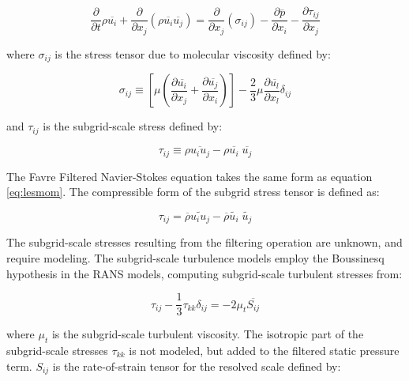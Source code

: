 \begin{equation} \label{eq:lesmom}
\frac{\partial}{\partial t} \rho \overline{u_i}
+ \frac{\partial}{\partial x_j} \left( \rho \overline{u_i} \overline{u_j} \right)
= \frac{\partial}{\partial x_j} \left( \sigma_{ij} \right)
- \frac{\partial \overline{p}}{\partial x_i}
- \frac{\partial \tau_{ij}}{\partial x_j}
\end{equation}

\noindent where $\sigma_{ij}$ is the stress tensor due to molecular viscosity defined by:

\begin{equation} \label{eq:lesstress}
\sigma_{ij}
\equiv
\left[ \mu \left( \frac{\partial \overline{u_i}}{\partial x_{j}} + \frac{\partial \overline{u_j}}{\partial x_{i}} \right) \right]
- \frac{2}{3} \mu \frac{\partial \overline{u_l}}{\partial x_l} \delta_{ij}
\end{equation}

\noindent and $\tau_{ij}$ is the subgrid-scale stress defined by:

\begin{equation} \label{eq:lessubstress}
\tau_{ij} \equiv \rho \overline{u_i u_j} - \rho \overline{u_i} \; \overline{u_j}
\end{equation}

The Favre Filtered Navier-Stokes equation takes the same form as equation \ref{eq:lesmom}. The compressible form of the subgrid stress tensor is defined as:

\begin{equation} \label{eq:lescompsub}
\tau_{ij} = \overline{\rho} \tilde{u_i u_j} - \overline{\rho} \tilde{u_i} \; \tilde{u_j}
\end{equation}

The subgrid-scale stresses resulting from the filtering operation are unknown, and require modeling. The subgrid-scale turbulence models employ the Boussinesq hypothesis \citep{bousinesque} in the RANS models, computing subgrid-scale turbulent stresses from:

\begin{equation} \label{eq:lesturbstress}
\tau_{ij} - \frac{1}{3} \tau_{kk} \delta_{ij} = -2 \mu_{t} \overline{S_{ij}}
\end{equation}

\noindent where $\mu_t$ is the subgrid-scale turbulent viscosity. The isotropic part of the subgrid-scale stresses $\tau_{kk}$ is not modeled, but added to the filtered static pressure term. $S_{ij}$ is the rate-of-strain tensor for the resolved scale defined by:

